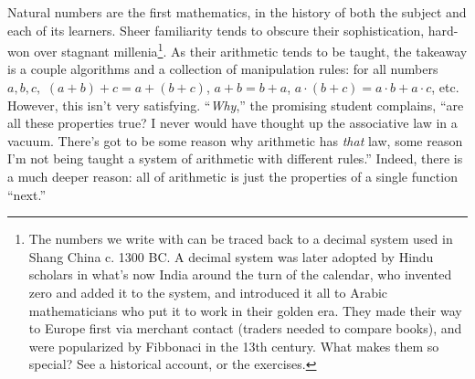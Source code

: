 Natural numbers are the first mathematics, in the history of both the subject and each of its learners.
Sheer familiarity tends to obscure their sophistication, hard-won over stagnant millenia\footnote
{
  The numbers we write with can be traced back to a decimal system used in Shang China c. 1300 BC. %
  A decimal system was later adopted by Hindu scholars in what's now India around the turn of the calendar,
  who invented zero and added it to the system, and introduced it all to Arabic mathematicians who put it to work in their golden era.
  They made their way to Europe first via merchant contact (traders needed to compare books),
  and were popularized by Fibbonaci in the 13th century.
  What makes them so special?
  See a historical account, or the exercises. %
}.
As their arithmetic tends to be taught, the takeaway is a couple algorithms and a collection of manipulation rules: for all numbers $a, b, c,$
$(a + b) + c = a + (b + c)$, $a + b = b + a$, $a \cdot (b + c) = a \cdot b + a \cdot c$, etc.
However, this isn't very satisfying.
``\textit{Why},'' the promising student complains, ``are all these properties true? I never would have thought up the associative law in a vacuum.
There's got to be some reason why arithmetic has \textit{that} law, some reason I'm not being taught a system of arithmetic with different rules.''
Indeed, there is a much deeper reason: all of arithmetic is just the properties of a single function ``next.''

